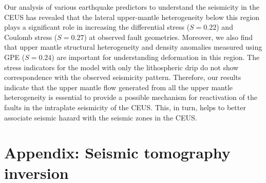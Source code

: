 \documentclass[draft,linenumbers]{agujournal2018}
\begin{document}
Our analysis of various earthquake predictors to understand the seismicity in the CEUS has revealed that the lateral upper-mantle heterogeneity below this region plays a significant role in increasing the differential stress ($S=0.22$) and Coulomb stress ($S=0.27$) at observed fault geometries. Moreover, we also find that upper mantle structural heterogeneity and density anomalies measured using GPE ($S=0.24$) are important for understanding deformation in this region. The stress indicators for the model with only the lithospheric drip do not show correspondence with the observed seismicity pattern. Therefore, our results indicate that the upper mantle flow generated from all the upper mantle heterogeneity is essential to provide a possible mechanism for reactivation of the faults in the intraplate seismicity of the CEUS. This, in turn, helps to better associate seismic hazard with the seismic zones in the CEUS.

\appendix
\section{Appendix: Seismic tomography inversion}
\end{document}
